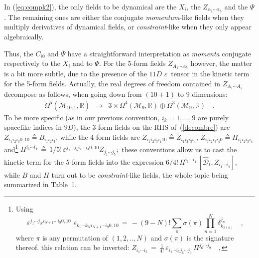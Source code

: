 \documentclass[a4paper,11pt]{article}
\begin{document}
In (\ref{eq:compk2}), the only fields to be dynamical are the $X_{i}$, the 
$Z_{\alpha_{1}\cdots \alpha _{5}}$ and the $\Psi $. The remaining ones are either the conjugate 
\textit{momentum}-like fields when they multiply derivatives of dynamical fields, or 
\textit{constraint}-like when they only appear algebraically.

Thus, the $C_{i0}$ and $\overline{\Psi }$ have a straightforward
interpretation as \textit{momenta} conjugate respectively to the $X_{i}$ and
to $\Psi $. For the 5-form fields $Z_{A_{1}\cdots A_{5}}$ however, the
matter is a bit more subtle, due to the presence of the $11D$ $\varepsilon $~tensor 
in the kinetic term for the 5-form fields. Actually,
the real degrees of freedom contained in $Z_{A_{1}\cdots A_{5}}$ decompose as follows, 
when going down from $(10+1)$ to $9$ dimensions: 
\begin{eqnarray}\label{decombre}
\Omega ^{5}(\mathcal{M}_{10,1},\mathbb{R}) &\longrightarrow &
3\times\Omega ^{4}(\mathcal{M}_{9},\mathbb{R})\oplus \Omega ^{3}(\mathcal{M}_{9},\mathbb{R}
)\quad .
\end{eqnarray}
To be more specific (as in our previous convention, $i_{k}=1,\ldots , 9$ are
purely spacelike indices in $9D$), the 3-form fields on the RHS of~(\ref{decombre}) are 
$Z_{i_{1}i_{2}i_{3}0,10}\triangleq B_{i_{1}i_{2}i_{3}}$, while the 4-form fields are
$Z_{i_{1}i_{2}i_{3}i_{4}10}\triangleq Z_{i_{1}i_{2}i_{3}i_{4}}$, 
$Z_{i_{1}i_{2}i_{3}i_{4}0}\triangleq H_{i_{1}i_{2}i_{3}i_{4}}$ and\footnote{Using
$$
\varepsilon ^{j_{1}\cdots j_{N}i_{N+1}\cdots i_{9}0,10}\,\,\varepsilon
_{k_{1}\cdots k_{N}i_{N+1}\cdots i_{9}0,10}\,=\,-(9-N)!\sum_{\pi }\sigma
(\pi )\prod_{n=1}^{N}\delta _{k_{\pi (n)}}^{j_{n}}\quad ,  
$$ where $\pi $ is any permutation of $(1,2,..,N)$ and $\sigma (\pi )$ is the
signature thereof, this relation can be inverted:
$
Z_{i_{1}\cdots i_{5}}\,=\,\frac{1}{4!}\,\varepsilon _{i_{1}\cdots
i_{5}j_{6}\cdots j_{9}}\,\Pi ^{j_{6}\cdots j_{9}}\quad ,
$}
$\Pi^{i_{1}\cdots i_{4}}\,\triangleq \,1/5!\,\varepsilon ^{j_{1}\cdots
j_{5}i_{1}\cdots i_{4}0,10}Z_{j_{1}\cdots j_{5}};$ these conventions allow us
to cast the kinetic term for the 5-form fields into the expression
$6/4!\,\Pi^{i_{1}\cdots i_{4}}\,[\mathcal{\widehat{D}}_{t},Z_{i_{1}\cdots i_{4}}]$,
while $B$ and $H$ turn out to be \textit{constraint}-like
fields, the whole topic being summarized in Table~1.
\end{document}
